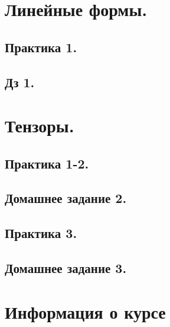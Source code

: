 \maketitle
\tableofcontents

\newpage
\section{Линейные формы.}
\subsection{Практика 1.}

\newpage
\subsection{Дз 1.}

\newpage
\section{Тензоры.}
\subsection{Практика 1-2.}

\newpage
\subsection{Домашнее задание 2.}

\newpage
\subsection{Практика 3.}

\newpage
\subsection{Домашнее задание 3.}

\newpage


\section{Информация о курсе}


